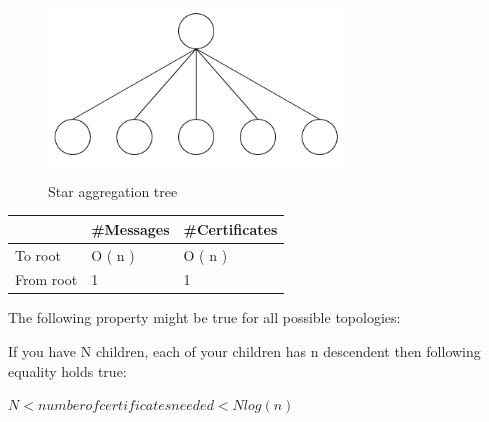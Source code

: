 	\begin{figure}[t]\label{star-aggregation-tree}
		\centering
			\includegraphics[width=0.7\textwidth]{images/star-aggregation-tree.png}\\
			\caption{Star aggregation tree}
	\end{figure}
	\begin{tabular}{ | l | l | l |}
		\hline
			\ & \#Messages & \#Certificates \\
		\hline
			To root	& O ( n ) & O ( n ) \\
		\hline
			From root & 1 & 1 \\
		\hline 
	\end{tabular}
		\newline
		\newline


The following property might be true for all possible topologies:

If you have N children, each of your children has n descendent then following equality holds true:

$ N < number of certificates needed < N log(n) $